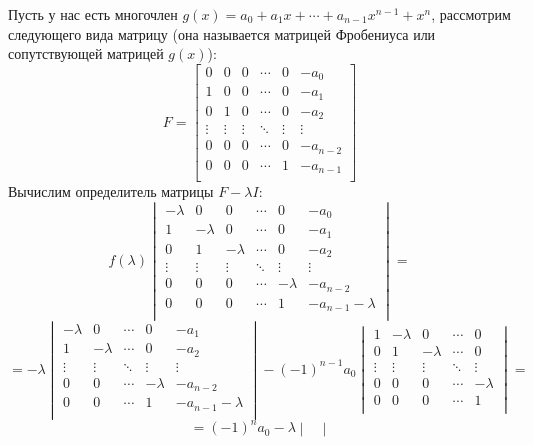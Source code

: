 \documentclass[12pt]{article} %
\begin{document}
\begin{enumerate}
    Пусть у нас есть многочлен $g(x) = a_0 + a_1x + \cdots + a_{n - 1}x^{n - 1} + x^n$, рассмотрим следующего вида матрицу (она называется матрицей Фробениуса или сопутствующей матрицей $g(x)$): 
    \[
    F = 
    \begin{bmatrix}
        0 & 0 & 0 & \cdots & 0 &-a_0\\
        1 & 0 & 0 & \cdots & 0 &-a_1\\
        0 & 1 & 0 & \cdots & 0 & -a_2\\
        \vdots & \vdots & \vdots & \ddots & \vdots & \vdots\\
        0 & 0 & 0 & \cdots & 0 & -a_{n - 2}\\
        0 & 0 & 0 &\cdots & 1 & -a_{n - 1}\\
    \end{bmatrix}
    \]
    Вычислим определитель  матрицы $F - \lambda I$:
    \[
    f(\lambda)
    \begin{vmatrix}
        -\lambda & 0 & 0 & \cdots & 0 &-a_0\\
        1 &  -\lambda & 0 & \cdots & 0 &-a_1\\
        0 & 1 &  -\lambda & \cdots & 0 & -a_2\\
        \vdots & \vdots & \vdots & \ddots & \vdots & \vdots\\
        0 & 0 & 0 & \cdots &  -\lambda & -a_{n - 2}\\
        0 & 0 & 0 &\cdots & 1 & -a_{n - 1}  -\lambda\\
    \end{vmatrix} =\]\[ = -\lambda
    \begin{vmatrix}
     
         -\lambda & 0 & \cdots & 0 &-a_1\\
        1 &  -\lambda & \cdots & 0 & -a_2\\
        \vdots & \vdots & \ddots & \vdots & \vdots\\
         0 & 0 & \cdots &  -\lambda & -a_{n - 2}\\
         0 & 0 &\cdots & 1 & -a_{n - 1}  -\lambda\\
    \end{vmatrix} -(-1)^{n - 1}a_0 
    \begin{vmatrix}
        1 &  -\lambda & 0 & \cdots & 0 \\
        0 & 1 &  -\lambda & \cdots & 0 \\
        \vdots & \vdots & \vdots & \ddots & \vdots \\
        0 & 0 & 0 & \cdots &  -\lambda \\
        0 & 0 & 0 &\cdots & 1 \\
    \end{vmatrix} = 
    \]
    \[
    = (-1)^na_0 - \lambda
     \begin{vmatrix}
     

\end{vmatrix}\]
\end{enumerate}
\end{document}
